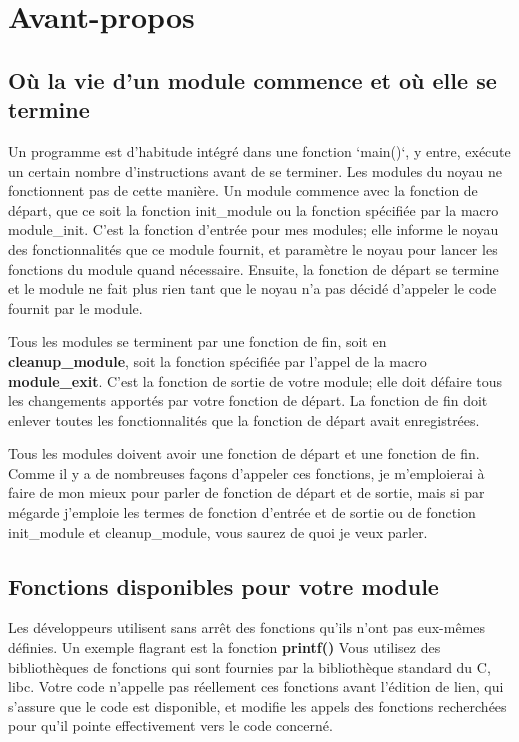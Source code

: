 \documentclass[11pt]{article}
\begin{document}
\section*{Avant-propos}
\label{sec-5}

\subsection*{Où la vie d'un module commence et où elle se termine}
\label{sec-5-1}

Un programme est d'habitude intégré dans une fonction `main()`, y entre, exécute un certain nombre d'instructions avant de se terminer. Les modules du noyau ne fonctionnent pas de cette manière. Un module commence avec la fonction de départ, que ce soit la fonction init\_module ou la fonction spécifiée par la macro module\_init. C'est la fonction d'entrée pour mes modules; elle informe le noyau des fonctionnalités que ce module fournit, et paramètre le noyau pour lancer les fonctions du module quand nécessaire. Ensuite, la fonction de départ se termine et le module ne fait plus rien tant que le noyau n'a pas décidé d'appeler le code fournit par le module.

Tous les modules se terminent par une fonction de fin, soit en \textbf{cleanup\_module}, soit la fonction spécifiée par l'appel de la macro \textbf{module\_exit}. C'est la fonction de sortie de votre module; elle doit défaire tous les changements apportés par votre fonction de départ. La fonction de fin doit enlever toutes les fonctionnalités que la fonction de départ avait enregistrées.

Tous les modules doivent avoir une fonction de départ et une fonction de fin. Comme il y a de nombreuses façons d'appeler ces fonctions, je m'emploierai à faire de mon mieux pour parler de fonction de départ et de sortie, mais si par mégarde j'emploie les termes de fonction d'entrée et de sortie ou de fonction init\_module et cleanup\_module, vous saurez de quoi je veux parler.

\subsection*{Fonctions disponibles pour votre module}
\label{sec-5-2}

Les développeurs utilisent sans arrêt des fonctions qu'ils n'ont pas eux-mêmes définies. Un exemple flagrant est la fonction \textbf{printf()} Vous utilisez des bibliothèques de fonctions qui sont fournies par la bibliothèque standard du C, libc. Votre code n'appelle pas réellement ces fonctions avant l'édition de lien, qui s'assure que le code est disponible, et modifie les appels des fonctions recherchées pour qu'il pointe effectivement vers le code concerné.
\end{document}
